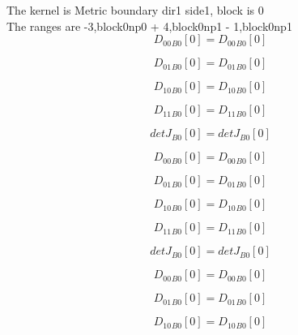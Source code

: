 \documentclass{article}
\begin{document}
\noindent The kernel is Metric boundary dir1 side1, block is 0\\\noindent The ranges are -3,block0np0 + 4,block0np1 - 1,block0np1\\\begin{dmath}{D_{00}{_{B0}}}[{0}] = {D_{00}{_{B0}}}[{0}]\end{dmath}

\begin{dmath}{D_{01}{_{B0}}}[{0}] = {D_{01}{_{B0}}}[{0}]\end{dmath}

\begin{dmath}{D_{10}{_{B0}}}[{0}] = {D_{10}{_{B0}}}[{0}]\end{dmath}

\begin{dmath}{D_{11}{_{B0}}}[{0}] = {D_{11}{_{B0}}}[{0}]\end{dmath}

\begin{dmath}{detJ{_{B0}}}[{0}] = {detJ{_{B0}}}[{0}]\end{dmath}

\begin{dmath}{D_{00}{_{B0}}}[{0}] = {D_{00}{_{B0}}}[{0}]\end{dmath}

\begin{dmath}{D_{01}{_{B0}}}[{0}] = {D_{01}{_{B0}}}[{0}]\end{dmath}

\begin{dmath}{D_{10}{_{B0}}}[{0}] = {D_{10}{_{B0}}}[{0}]\end{dmath}

\begin{dmath}{D_{11}{_{B0}}}[{0}] = {D_{11}{_{B0}}}[{0}]\end{dmath}

\begin{dmath}{detJ{_{B0}}}[{0}] = {detJ{_{B0}}}[{0}]\end{dmath}

\begin{dmath}{D_{00}{_{B0}}}[{0}] = {D_{00}{_{B0}}}[{0}]\end{dmath}

\begin{dmath}{D_{01}{_{B0}}}[{0}] = {D_{01}{_{B0}}}[{0}]\end{dmath}

\begin{dmath}{D_{10}{_{B0}}}[{0}] = {D_{10}{_{B0}}}[{0}]\end{dmath}
\end{document}
